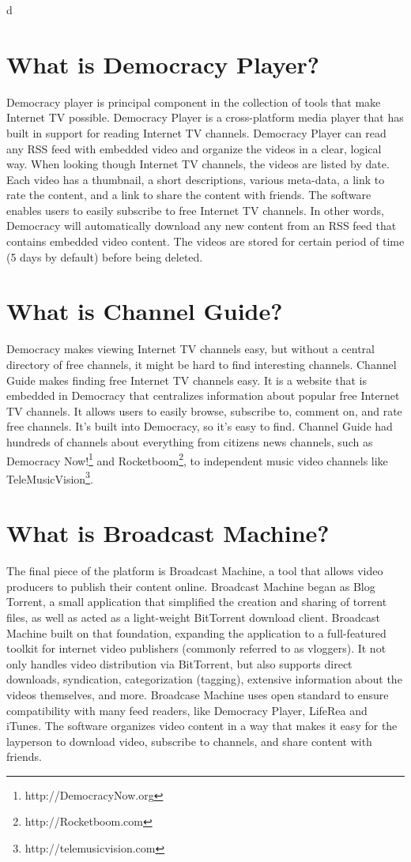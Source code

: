 d\documentclass[a4paper,12pt]{report}
\begin{document}
\section{What is Democracy Player?}
Democracy player is principal component in the collection of tools that make Internet TV possible.
Democracy Player is a cross-platform media player that has built in support for reading Internet TV channels.
Democracy Player can read any RSS feed with embedded video and organize the videos in a clear, logical way.
When looking though Internet TV channels, the videos are listed by date. Each video has a thumbnail, a short descriptions, various meta-data, a link to rate the content, and a link to share the content with friends.
The software enables users to easily subscribe to free Internet TV channels.
In other words, Democracy will automatically download any new content from an RSS feed that contains embedded video content.
The videos are stored for certain period of time (5 days by default) before being deleted.

\section {What is Channel Guide?}
Democracy makes viewing Internet TV channels easy, but without a central directory of free channels, it might be hard to find interesting channels.
Channel Guide makes finding free Internet TV channels easy.
It is a website that is embedded in Democracy that centralizes information about popular free Internet TV channels.
It allows users to easily browse, subscribe to, comment on, and rate free channels.
It's built into Democracy, so it's easy to find.
Channel Guide had hundreds of channels about everything from citizens news channels, such as Democracy Now!\footnote {http://DemocracyNow.org} and Rocketboom\footnote {http://Rocketboom.com}, to independent music video channels like TeleMusicVision\footnote{http://telemusicvision.com}.

\section{What is Broadcast Machine?}
	The final piece of the platform is Broadcast Machine, a tool that allows video producers to publish their content online.
	Broadcast Machine began as Blog Torrent, a small application that simplified the creation and sharing of torrent files, as well as acted as a light-weight BitTorrent download client. 
Broadcast Machine built on that foundation, expanding the application to a full-featured toolkit for internet video publishers (commonly referred to as vloggers).
It not only handles video distribution via BitTorrent, but also supports direct downloads, syndication, categorization (tagging), extensive information about the videos themselves, and more.
Broadcase Machine uses open standard to ensure compatibility with many feed readers, like Democracy Player, LifeRea and iTunes.
The software organizes video content in a way that makes it easy for the layperson to download video, subscribe to channels, and share content with friends.
\end{document}
